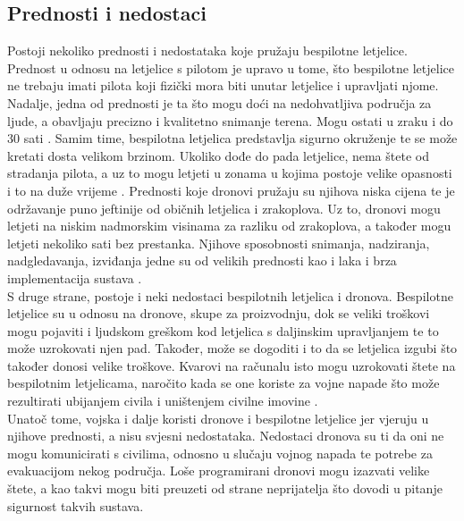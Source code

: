 \documentclass[times, utf8, diplomski]{fer}
\begin{document}
\subsection{Prednosti i nedostaci}
Postoji nekoliko prednosti i nedostataka koje pružaju bespilotne letjelice. Prednost u odnosu na letjelice s pilotom je upravo u tome, što bespilotne letjelice ne trebaju imati pilota 
koji fizički  mora  biti  unutar  letjelice i upravljati  njome.  Nadalje, jedna od prednosti je ta što mogu doći na nedohvatljiva područja za ljude, a obavljaju precizno i kvalitetno snimanje terena. Mogu ostati u zraku i do 30 sati \citep{AdvantagesofUAS}. Samim time, bespilotna letjelica predstavlja sigurno okruženje te se može kretati dosta velikom brzinom. Ukoliko dođe do pada letjelice, nema štete od stradanja pilota, a uz to mogu letjeti u zonama u kojima postoje velike opasnosti i to na duže vrijeme \citep{Soffar}.
Prednosti koje dronovi pružaju su njihova niska cijena te je održavanje puno jeftinije od običnih letjelica i zrakoplova. Uz to, dronovi mogu letjeti na niskim nadmorskim visinama za razliku od zrakoplova, a također mogu letjeti nekoliko sati bez prestanka. Njihove sposobnosti snimanja, nadziranja, nadgledavanja, izviđanja jedne su od velikih prednosti kao i laka i brza implementacija sustava \citep{PhilForHumanity}.\\
S  druge  strane,  postoje  i  neki  nedostaci  bespilotnih  letjelica  i  dronova. Bespilotne letjelice su u odnosu na dronove, skupe za proizvodnju, dok se veliki troškovi mogu pojaviti i ljudskom greškom kod letjelica s daljinskim upravljanjem te to može uzrokovati njen pad. Također, može se dogoditi i to da se letjelica izgubi što također donosi velike troškove. Kvarovi na računalu isto mogu uzrokovati štete na bespilotnim letjelicama, naročito kada se one koriste za vojne napade što može rezultirati ubijanjem civila i uništenjem  civilne  imovine \citep{Soffar}. \\
Unatoč tome, vojska i dalje koristi dronove i  bespilotne letjelice jer vjeruju u njihove prednosti, a nisu svjesni nedostataka. Nedostaci dronova su ti da oni ne mogu komunicirati s civilima, odnosno u slučaju vojnog napada te potrebe za evakuacijom nekog područja. Loše programirani dronovi mogu izazvati velike štete, a kao takvi mogu biti preuzeti od strane neprijatelja što dovodi u pitanje sigurnost takvih sustava. 


 
\end{document}
